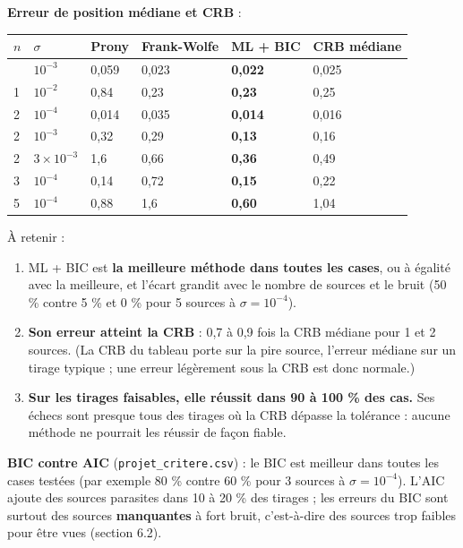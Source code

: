 \documentclass[
  french,
]{article}
\newcounter{none} %
\providecommand{\tightlist}{%
  \setlength{\itemsep}{0pt}\setlength{\parskip}{0pt}}
\begin{document}
\textbf{Erreur de position médiane et CRB} :

{\def\LTcaptype{none} %
\begin{longtable}[]{@{}llllll@{}}
\toprule\noalign{}
\(n\) & \(\sigma\) & Prony & Frank-Wolfe & ML + BIC & CRB médiane \\
\midrule\noalign{}
\endhead
\bottomrule\noalign{}
\endlastfoot
1 & \(10^{-3}\) & 0,059 & 0,023 & \textbf{0,022} & 0,025 \\
1 & \(10^{-2}\) & 0,84 & 0,23 & \textbf{0,23} & 0,25 \\
2 & \(10^{-4}\) & 0,014 & 0,035 & \textbf{0,014} & 0,016 \\
2 & \(10^{-3}\) & 0,32 & 0,29 & \textbf{0,13} & 0,16 \\
2 & \(3\times 10^{-3}\) & 1,6 & 0,66 & \textbf{0,36} & 0,49 \\
3 & \(10^{-4}\) & 0,14 & 0,72 & \textbf{0,15} & 0,22 \\
5 & \(10^{-4}\) & 0,88 & 1,6 & \textbf{0,60} & 1,04 \\
\end{longtable}
}

À retenir :

\begin{enumerate}
\def\labelenumi{\arabic{enumi}.}
\tightlist
\item
  ML + BIC est \textbf{la meilleure méthode dans toutes les cases}, ou à
  égalité avec la meilleure, et l'écart grandit avec le nombre de
  sources et le bruit (50 \% contre 5 \% et 0 \% pour 5 sources à
  \(\sigma = 10^{-4}\)).
\item
  \textbf{Son erreur atteint la CRB} : 0,7 à 0,9 fois la CRB médiane
  pour 1 et 2 sources. (La CRB du tableau porte sur la pire source,
  l'erreur médiane sur un tirage typique ; une erreur légèrement sous la
  CRB est donc normale.)
\item
  \textbf{Sur les tirages faisables, elle réussit dans 90 à 100 \% des
  cas.} Ses échecs sont presque tous des tirages où la CRB dépasse la
  tolérance : aucune méthode ne pourrait les réussir de façon fiable.
\end{enumerate}

\textbf{BIC contre AIC} (\texttt{projet\_critere.csv}) : le BIC est
meilleur dans toutes les cases testées (par exemple 80 \% contre 60 \%
pour 3 sources à \(\sigma = 10^{-4}\)). L'AIC ajoute des sources
parasites dans 10 à 20 \% des tirages ; les erreurs du BIC sont surtout
des sources \textbf{manquantes} à fort bruit, c'est-à-dire des sources
trop faibles pour être vues (section 6.2).
\end{document}
